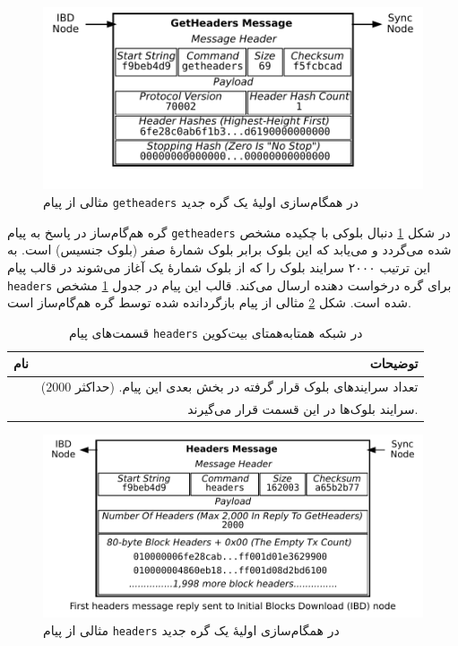 \begin{figure}[h]
	\centering
	\includegraphics[width=0.7\linewidth]{image/getheaders}
	\caption{مثالی از پیام \texttt{getheaders} در همگام‌سازی اولیهٔ یک گره جدید}
	\label{fig:getheaders}
\end{figure}


گره هم‌گام‌ساز در پاسخ به پیام \texttt{getheaders} در شکل \ref{fig:getheaders} دنبال بلوکی با چکیده مشخص شده می‌گردد و می‌یابد که این بلوک برابر بلوک شمارهٔ صفر (بلوک جنسیس) است. به این ترتیب $۲۰۰۰$ سرایند بلوک را که از بلوک شمارهٔ یک آغاز می‌شوند در قالب پیام \texttt{headers} برای گره درخواست دهنده ارسال می‌کند. قالب این پیام در جدول \ref{table:HeadersMessage} مشخص شده‌ است. شکل \ref{fig:headers} مثالی از پیام بازگردانده شده توسط گره هم‌گام‌ساز است.

\begin{table}[!h]
	\centering
	\caption{
		قسمت‌های پیام \texttt{headers} در شبکه همتا‌به‌همتای بیت‌کوین
		\label{table:HeadersMessage}}
	\begin{tabular}{|c|r|}
		\hline
		\textbf{نام} & {\textbf{توضیحات}} \\
		\hline \hline
		
		\lr{count} & {%
			تعداد سرایند‌های بلوک قرار گرفته در بخش بعدی این پیام. (حداکثر $2000$)
		} \\
		\hline
		
		\lr{headers} & {%
			سرایند‌ بلوک‌ها در این قسمت قرار می‌گیرند.
		} \\
		\hline
	\end{tabular}
\end{table}

\begin{figure}[!h]
	\centering
	\includegraphics[width=0.7\linewidth]{image/headers}
	\caption{مثالی از پیام \texttt{headers} در همگام‌سازی اولیهٔ یک گره جدید}
	\label{fig:headers}
\end{figure}

